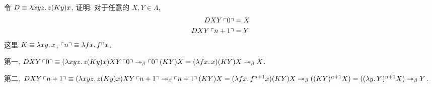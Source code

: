 \begin{problem}
令 $D \equiv \lambda {xyz}.\,{z(Ky)x}$, 证明: 对于任意的 $X, Y \in \Lambda$,
\begin{align*}
DXY\left\ulcorner 0 \right\urcorner & = X \\
DXY\left\ulcorner n+1 \right\urcorner & = Y \\
\end{align*}
这里 $K \equiv \lambda {xy}.\,{x}$, $\left\ulcorner n \right\urcorner \equiv \lambda {fx}.\,{f^nx}$.
\end{problem}

\begin{solution}

第一, $D X Y \left\ulcorner 0 \right\urcorner \equiv (\lambda {xyz}.\,{z(Ky)x}) X Y \left\ulcorner 0 \right\urcorner \twoheadrightarrow_\beta \left\ulcorner 0 \right\urcorner (K Y) X = (\lambda {fx}.\,{x}) (K Y) X \twoheadrightarrow_\beta X$.

第二, $D X Y \left\ulcorner n+1 \right\urcorner \equiv (\lambda {xyz}.\,{z(Ky)x}) X Y \left\ulcorner n+1 \right\urcorner \twoheadrightarrow_\beta \left\ulcorner n+1 \right\urcorner (K Y) X = (\lambda {fx}.\,{f^{n+1}x}) (K Y) X \twoheadrightarrow_\beta ((K Y)^{n+1} X) = ((\lambda {y}.\,{Y})^{n+1} X) \twoheadrightarrow_\beta Y$.
\end{solution}
